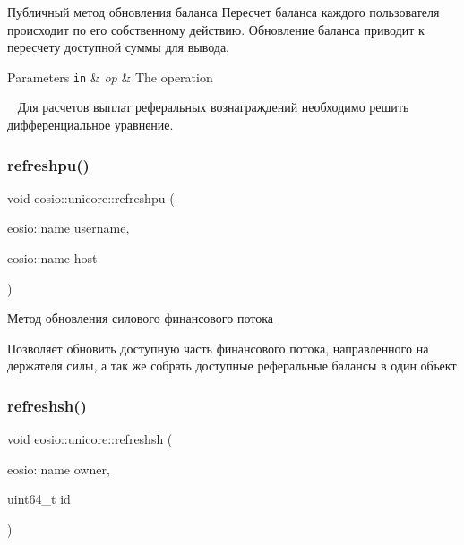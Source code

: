 Публичный метод обновления баланса Пересчет баланса каждого пользователя происходит по его собственному действию. Обновление баланса приводит к пересчету доступной суммы для вывода. 


\begin{DoxyParams}[1]{Parameters}
\mbox{\tt in}  & {\em op} & The operation \\
\hline
\end{DoxyParams}
~\newline
Для расчетов выплат реферальных вознаграждений необходимо решить дифференциальное уравнение.\mbox{\label{classeosio_1_1unicore_adc22e2d70fc4e3cb6a72b26a1d82186a}} 
\subsubsection{\texorpdfstring{refreshpu()}{refreshpu()}}
{\footnotesize\ttfamily void eosio\+::unicore\+::refreshpu (\begin{DoxyParamCaption}\item[{eosio\+::name}]{username,  }\item[{eosio\+::name}]{host }\end{DoxyParamCaption})}



Метод обновления силового финансового потока 

Позволяет обновить доступную часть финансового потока, направленного на держателя силы, а так же собрать доступные реферальные балансы в один объект \mbox{\label{classeosio_1_1unicore_acd107f6210ac17a454adf216765151f2}} 
\subsubsection{\texorpdfstring{refreshsh()}{refreshsh()}}
{\footnotesize\ttfamily void eosio\+::unicore\+::refreshsh (\begin{DoxyParamCaption}\item[{eosio\+::name}]{owner,  }\item[{uint64\+\_\+t}]{id }\end{DoxyParamCaption})}



